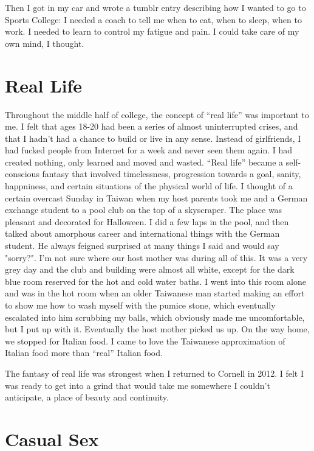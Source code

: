 \documentclass[12pt]{article}
\begin{document}
Then I got in my car and wrote a tumblr entry describing how I wanted to go to
Sports College: I needed a coach to tell me when to eat, when to sleep, when to
work.  I needed to learn to control my fatigue and pain.  I could take care of
my own mind, I thought.




\section{Real Life} 

Throughout the middle half of college, the concept of ``real life'' was
important to me.  I felt that ages 18-20 had been a series of almost
uninterrupted crises, and that I hadn't had a chance to build or live in any
sense.  Instead of girlfriends, I had fucked people from Internet for a week and
never seen them again.  I had created nothing, only learned and moved and
wasted.  ``Real life'' became a self-conscious fantasy that involved
timelessness, progression towards a goal, sanity, happniness, and certain
situations of the physical world of life.  I thought of a certain overcast
Sunday in Taiwan when my host parents took me and a German exchange student to a
pool club on the top of a skyscraper.  The place was pleasant and decorated for
Halloween.  I did a few laps in the pool, and then talked about amorphous career
and international things with the German student.  He always feigned surprised
at many things I said and would say "sorry?".  I'm not sure where our host
mother was during all of this.  It was a very grey day and the club and building
were almost all white, except for the dark blue room reserved for the hot and
cold water baths.  I went into this room alone and was in the hot room when an
older Taiwanese man started making an effort to show me how to wash myself with
the pumice stone, which eventually escalated into him scrubbing my balls, which
obviously made me uncomfortable, but I put up with it.  Eventually the host
mother picked us up.  On the way home, we stopped for Italian food.  I came to
love the Taiwanese approximation of Italian food more than ``real'' Italian
food.

The fantasy of real life was strongest when I returned to Cornell in 2012.
I felt I was ready to get into a grind that would take me somewhere I couldn't
anticipate, a place of beauty and continuity.  

\section{Casual Sex}
\end{document}
